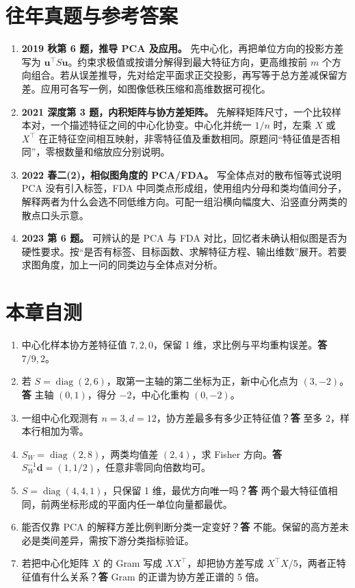 \documentclass[UTF8,a4paper,zihao=-4,fontset=fandol]{ctexrep}
\begin{document}
\section{往年真题与参考答案}
\begin{enumerate}[leftmargin=2em]
\item \textbf{2019 秋第 6 题，推导 PCA 及应用。} 先中心化，再把单位方向的投影方差写为 \(\bm u^\top S\bm u\)。约束求极值或按谱分解得到最大特征方向，更高维按前 \(m\) 个方向组合。若从误差推导，先对给定平面求正交投影，再写等于总方差减保留方差。应用可各写一例，如图像低秩压缩和高维数据可视化。
\item \textbf{2021 深度第 3 题，内积矩阵与协方差矩阵。} 先解释矩阵尺寸，一个比较样本对，一个描述特征之间的中心化协变。中心化并统一 \(1/n\) 时，左乘 \(X\) 或 \(X^\top\) 在正特征空间相互映射，非零特征值及重数相同。原题问“特征值是否相同”，零根数量和缩放应分别说明。
\item \textbf{2022 春二(2)，相似图角度的 PCA/FDA。} 写全体点对的散布恒等式说明 PCA 没有引入标签，FDA 中同类点形成组，使用组内分母和类均值间分子，解释两者为什么会选不同低维方向。可配一组沿横向幅度大、沿竖直分两类的散点口头示意。
\item \textbf{2023 第 6 题。} 可辨认的是 PCA 与 FDA 对比，回忆者未确认相似图是否为硬性要求。按“是否有标签、目标函数、求解特征方程、输出维数”展开。若要求图角度，加上一问的同类边与全体点对分析。
\end{enumerate}

\section{本章自测}
\begin{enumerate}[leftmargin=2em]
\item 中心化样本协方差特征值 \(7,2,0\)，保留 1 维，求比例与平均重构误差。\textbf{答} \(7/9,2\)。
\item 若 \(S=\operatorname{diag}(2,6)\)，取第一主轴的第二坐标为正，新中心化点为 \((3,-2)\)。\textbf{答} 主轴 \((0,1)\)，得分 \(-2\)，中心化重构 \((0,-2)\)。
\item 一组中心化观测有 \(n=3,d=12\)，协方差最多有多少正特征值？\textbf{答} 至多 \(2\)，样本行相加为零。
\item \(S_W=\operatorname{diag}(2,8)\)，两类均值差 \((2,4)\)，求 Fisher 方向。\textbf{答} \(S_W^{-1}\bm d=(1,1/2)\)，任意非零同向倍数均可。
\item \(S=\operatorname{diag}(4,4,1)\)，只保留 1 维，最优方向唯一吗？\textbf{答} 两个最大特征值相同，前两坐标形成的平面内任一单位向量都最优。
\item 能否仅靠 PCA 的解释方差比例判断分类一定变好？\textbf{答} 不能。保留的高方差未必是类间差异，需按下游分类指标验证。
\item 若把中心化矩阵 \(X\) 的 Gram 写成 \(XX^\top\)，却把协方差写成 \(X^\top X/5\)，两者正特征值有什么关系？\textbf{答} Gram 的正谱为协方差正谱的 5 倍。
\end{enumerate}
\end{document}
